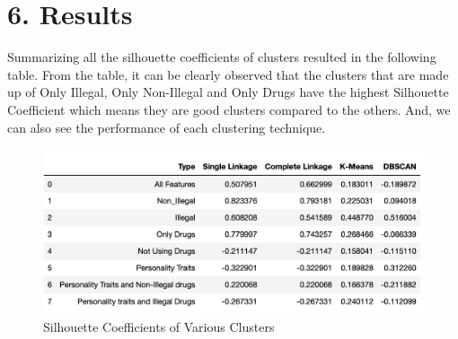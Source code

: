 \documentclass[10pt]{article}
\begin{document}
    
\section*{6. Results}

	Summarizing all the silhouette coefficients of clusters resulted in the following table. From the table, it can be clearly observed that the clusters that are made up of Only Illegal, Only Non-Illegal and Only Drugs have the highest Silhouette Coefficient which means they are good clusters compared to the others. And, we can also see the performance of each clustering technique.
 \begin{figure}[H]
\caption{Silhouette Coefficients of Various Clusters }
\label{fig:SilhouetteCoeff}
\centering
\includegraphics[scale=0.5]{Cluster_Table.png}
\end{figure}

    
\end{document}
